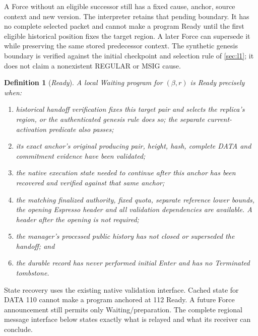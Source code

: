 \documentclass[11pt,a4paper]{article}
\newcommand{\defterm}[1]{\textcolor{rrBlue}{\textit{#1}}}
\newtheorem{definition}{Definition}[section]
\begin{document}
A Force without an eligible successor still has a fixed cause,
anchor, source context and new version. The interpreter retains that
pending boundary. It has no complete selected packet and cannot make
a program Ready until the first eligible historical position fixes
the target region. A later Force can supersede it while preserving the
same stored predecessor context. The synthetic genesis boundary is
verified against the initial checkpoint and selection rule of
\cref{sec:l1}; it does not claim a nonexistent REGULAR or MSIG
cause.

\begin{definition}[\defterm{Ready}]
\label{def:ready}
A local Waiting program for $(\beta,r)$ is Ready precisely when:
\begin{enumerate}[label=(\roman*)]
\item historical handoff verification fixes this target pair and selects the
replica's region, or the authenticated genesis rule does so; the separate
current-activation predicate also passes;
\item its exact anchor's original producing pair, height, hash,
complete DATA and commitment evidence have been validated;
\item the native execution state needed to continue after this
anchor has been recovered and verified against that same anchor;
\item the matching finalized authority, fixed quota, separate
reference lower bounds, the opening Espresso header and all validation
dependencies are available. A header after the opening is not required;
\item the manager's processed public history has not closed or
superseded the handoff; and
\item the durable record has never performed initial Enter and has
no Terminated tombstone.
\end{enumerate}
\end{definition}

State recovery uses the existing native validation interface. Cached state
for DATA 110 cannot make a program anchored at 112 Ready. A future Force
announcement still permits only Waiting/preparation. The complete regional
message interface below states exactly what is relayed and what its
receiver can conclude.


\end{document}
